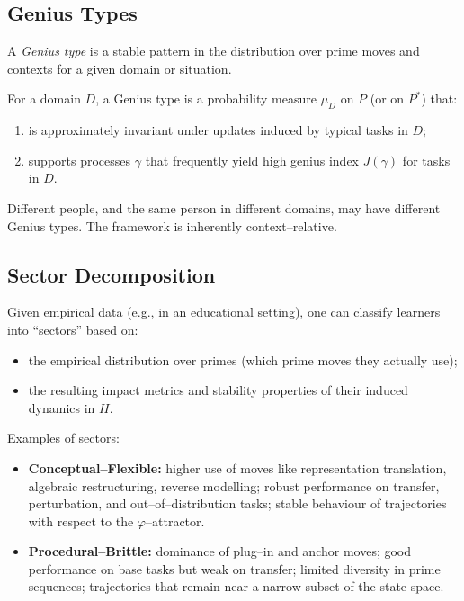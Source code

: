 \documentclass[11pt]{article}
\begin{document}
\subsection{Genius Types}

A \emph{Genius type} is a stable pattern in the distribution over prime moves and contexts for a given domain or situation.

\begin{description}[style=unboxed,leftmargin=0cm]
  \item[Definition (Genius Type).]
  For a domain $D$, a Genius type is a probability measure $\mu_D$ on $P$ (or on $P^\ast$) that:
  \begin{enumerate}[nosep]
    \item is approximately invariant under updates induced by typical tasks in $D$;
    \item supports processes $\gamma$ that frequently yield high genius index $J(\gamma)$ for tasks in $D$.
  \end{enumerate}
\end{description}

Different people, and the same person in different domains, may have different Genius types.
The framework is inherently context--relative.

\subsection{Sector Decomposition}

Given empirical data (e.g., in an educational setting), one can classify learners into ``sectors'' based on:
\begin{itemize}[nosep]
  \item the empirical distribution over primes (which prime moves they actually use);
  \item the resulting impact metrics and stability properties of their induced dynamics in $H$.
\end{itemize}

Examples of sectors:
\begin{itemize}[nosep]
  \item \textbf{Conceptual--Flexible:} higher use of moves like representation translation, algebraic restructuring, reverse modelling; robust performance on transfer, perturbation, and out--of--distribution tasks; stable behaviour of trajectories with respect to the $\varphi$--attractor.
  \item \textbf{Procedural--Brittle:} dominance of plug--in and anchor moves; good performance on base tasks but weak on transfer; limited diversity in prime sequences; trajectories that remain near a narrow subset of the state space.
\end{itemize}
\end{document}
